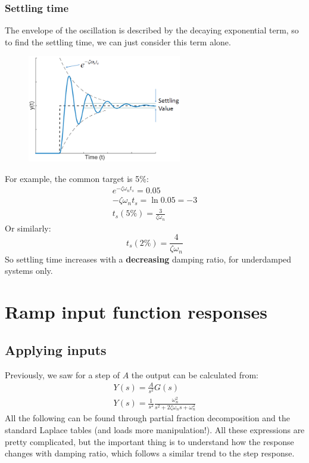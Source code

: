 \documentclass[class=report, crop=false, 12pt,a4paper]{standalone}
\begin{document}
\subsubsection{Settling time}
The envelope of the oscillation is described by the decaying exponential term, so to find the settling time, we can just consider this term alone.
\begin{figure}[H]
  \centering
  \includegraphics[width = 0.6\textwidth]{../img/diagram78.png}
\end{figure}
For example, the common target is 5\%:
\begin{gather}
  e^{-\zeta \omega_n t_s} = 0.05\\
  -\zeta \omega_n t_s = \ln{0.05} = -3\\
  t_s (5\%) = \frac{3}{\zeta \omega_n}
\end{gather}
Or similarly:
\begin{equation}
  t_s (2\%) = \frac{4}{\zeta \omega_n}
\end{equation}
So settling time increases with a \textbf{decreasing} damping ratio, for underdamped systems only.
\section{Ramp input function responses}
\subsection{Applying inputs}
Previously, we saw for a step of $A$ the output can be calculated from:
\begin{gather}
  Y(s) = \frac{A}{s^2} G(s)\\
  Y(s) = \frac{1}{s^2} \frac{\omega_n^2}{s^2 + 2\zeta \omega_n s + \omega_n^2}
\end{gather}
All the following can be found through partial fraction decomposition and the standard Laplace tables (and loads more manipulation!). All these expressions are pretty complicated, but the important thing is to understand how the response changes with damping ratio, which follows a similar trend to the step response. 
\end{document}
